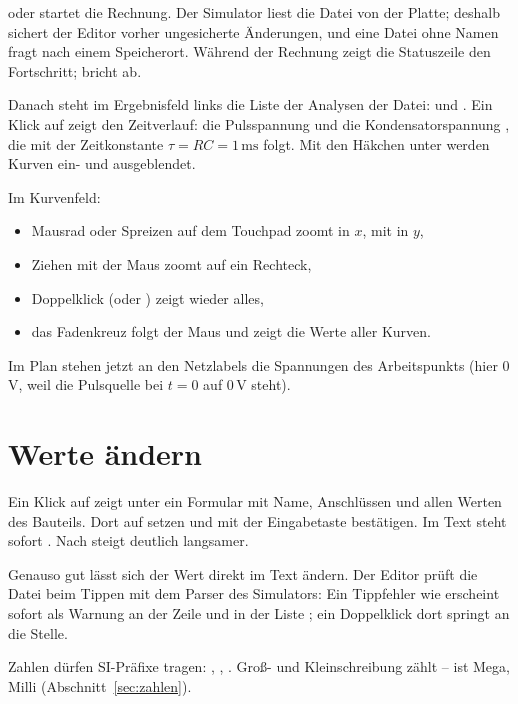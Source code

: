 \pfad{} oder  startet die
Rechnung. Der Simulator liest die Datei von der Platte; deshalb sichert der
Editor vorher ungesicherte Änderungen, und eine Datei ohne Namen fragt nach
einem Speicherort. Während der Rechnung zeigt
die Statuszeile den Fortschritt;  bricht ab.

Danach steht im Ergebnisfeld links die Liste der Analysen der Datei:
 und . Ein Klick auf
 zeigt den Zeitverlauf: die Pulsspannung  und
die Kondensatorspannung , die mit der Zeitkonstante
$\tau = RC = 1\,\text{ms}$ folgt. Mit den Häkchen unter  werden Kurven ein- und ausgeblendet.

Im Kurvenfeld:
\begin{itemize}
  \item Mausrad oder Spreizen auf dem Touchpad zoomt in $x$, mit
     in $y$,
  \item Ziehen mit der Maus zoomt auf ein Rechteck,
  \item Doppelklick (oder ) zeigt wieder alles,
  \item das Fadenkreuz folgt der Maus und zeigt die Werte aller Kurven.
\end{itemize}

Im Plan stehen jetzt an den Netzlabels die Spannungen des Arbeitspunkts
(hier 0\,V, weil die Pulsquelle bei $t=0$ auf 0\,V steht).

\section{Werte ändern}

Ein Klick auf  zeigt unter  ein Formular mit
Name, Anschlüssen und allen Werten des Bauteils. Dort  auf
 setzen und mit der Eingabetaste bestätigen. Im Text steht
sofort . Nach  steigt 
deutlich langsamer.

Genauso gut lässt sich der Wert direkt im Text ändern. Der Editor prüft
die Datei beim Tippen mit dem Parser des Simulators: Ein Tippfehler wie
 erscheint sofort als Warnung an der Zeile und in der Liste
; ein Doppelklick dort springt an die Stelle.

\begin{hinweis}
  Zahlen dürfen SI-Präfixe tragen: , , .
  Groß- und Kleinschreibung zählt –  ist Mega,  Milli
  (Abschnitt~\ref{sec:zahlen}).
\end{hinweis}


